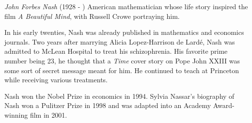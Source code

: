 \documentclass[12pt]{article}
\begin{document}
\emph{John Forbes Nash} (1928 - ) American mathematician whose life story inspired the film {\it A Beautiful Mind}, with Russell Crowe portraying him.

In his early twenties, Nash was already published in mathematics and economics journals. Two years after marrying Alicia Lopez-Harrison de Lard\'e, Nash was admitted to McLean Hospital to treat his schizophrenia. His favorite prime number being 23, he thought that a {\it Time} cover story on Pope John XXIII was some sort of secret message meant for him. He continued to teach at Princeton while receiving various treatments.

Nash won the Nobel Prize in economics in 1994. Sylvia Nassar's biography of Nash won a Pulitzer Prize in 1998 and was adapted into an Academy Award-winning film in 2001.
\end{document}
